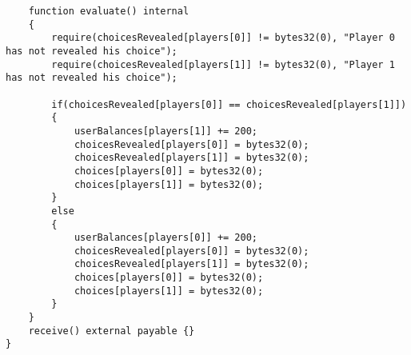 \documentclass[12pt,addpoints,answers]{exam}
\begin{document}
\begin{questions}
\begin{verbatim}
    function evaluate() internal
    {
        require(choicesRevealed[players[0]] != bytes32(0), "Player 0 has not revealed his choice");
        require(choicesRevealed[players[1]] != bytes32(0), "Player 1 has not revealed his choice");

        if(choicesRevealed[players[0]] == choicesRevealed[players[1]])
        {
            userBalances[players[1]] += 200;
            choicesRevealed[players[0]] = bytes32(0);
            choicesRevealed[players[1]] = bytes32(0);
            choices[players[0]] = bytes32(0);
            choices[players[1]] = bytes32(0);
        }
        else
        {
            userBalances[players[0]] += 200;
            choicesRevealed[players[0]] = bytes32(0);
            choicesRevealed[players[1]] = bytes32(0);
            choices[players[0]] = bytes32(0);
            choices[players[1]] = bytes32(0);
        }
    }
    receive() external payable {}
}
\end{verbatim}
\newpage

~\\

\end{questions}
\end{document}
